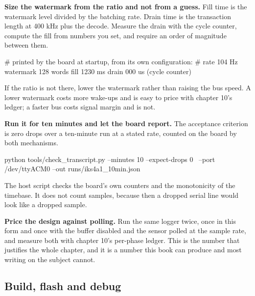 \begin{steps}
\item \textbf{Size the watermark from the ratio and not from a guess.} Fill time
is the watermark level divided by the batching rate. Drain time is the
transaction length at 400 kHz plus the decode. Measure the drain with the cycle
counter, compute the fill from numbers you set, and require an order of
magnitude between them.
\begin{shellcode}
# printed by the board at startup, from its own configuration:
# rate 104 Hz  watermark 128 words  fill 1230 ms  drain 000 us (cycle counter)
\end{shellcode}
If the ratio is not there, lower the watermark rather than raising the bus
speed. A lower watermark costs more wake-ups and is easy to price with chapter
10's ledger; a faster bus costs signal margin and is not.

\item \textbf{Run it for ten minutes and let the board report.} The acceptance
criterion is zero drops over a ten-minute run at a stated rate, counted on the
board by both mechanisms.
\begin{shellcode}
python tools/check_transcript.py --minutes 10 --expect-drops 0 \
    --port /dev/ttyACM0 --out runs/iks4a1_10min.json
\end{shellcode}
The host script checks the board's own counters and the monotonicity of the
timebase. It does not count samples, because then a dropped serial line would
look like a dropped sample.

\item \textbf{Price the design against polling.} Run the same logger twice, once
in this form and once with the buffer disabled and the sensor polled at the
sample rate, and measure both with chapter 10's per-phase ledger. This is the
number that justifies the whole chapter, and it is a number this book can produce
and most writing on the subject cannot.
\end{steps}

\subsection*{Build, flash and debug}



